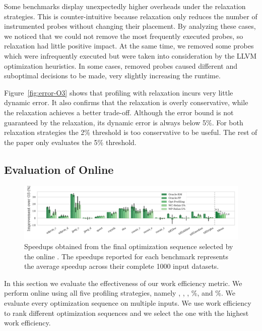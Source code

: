 Some benchmarks display unexpectedly higher overheads under the relaxation strategies. This is counter-intuitive because relaxation only
reduces the number of instrumented probes without changing their placement. By analyzing these cases, we noticed that we could not remove
the most frequently executed probes, so relaxation had little positive impact. At the same time, we removed some probes which were
infrequently executed but were taken into consideration by the LLVM optimization heuristics. In some cases, removed probes caused different
and suboptimal decisions to be made, very slightly increasing the runtime.

Figure~\ref{fig:error-O3} shows that profiling with relaxation incurs very little dynamic error. It also confirms that the \WCRelaxLower
relaxation is overly conservative, while the \WPRelaxLower relaxation achieves a better trade-off. Although the error bound is not
guaranteed by the \WPRelaxLower relaxation, its dynamic error is always below 5\%. For both relaxation strategies the 2\% threshold is too
conservative to be useful. The rest of the paper only evaluates the 5\% threshold.

\subsection{Evaluation of Online {\IterComp}}

\begin{figure}[t]
    \centering
    \includegraphics[width=\textwidth]{figs/speedups.pdf}
    \caption{Speedups obtained from the final optimization sequence selected by the online {\itercomp}.
             The speedups reported for each benchmark represents the average speedup across their complete 1000 input datasets.}
    \label{fig:speedups}
\end{figure}

In this section we evaluate the effectiveness of our work efficiency metric. We perform online {\itercomp} using all five profiling
strategies, namely \OracleRM, \OraclePP, \OptProf, \%, and \%. We evaluate every optimization sequence on multiple
inputs. We use work efficiency to rank different optimization sequences and we select the one with the highest work efficiency.

